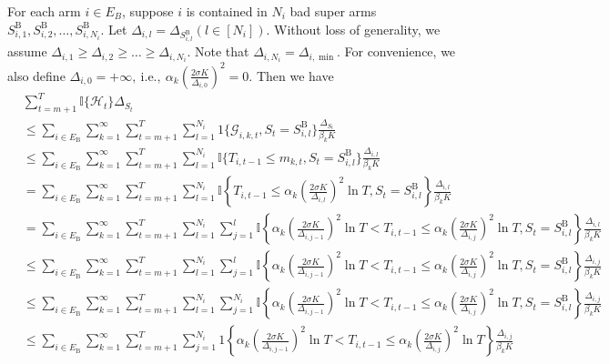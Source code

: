 \documentclass[opre,sglanonrev]{informs4}
\begin{document}
For each arm $i\in E_B$, suppose $i$ is contained in $N_i$ bad super arms $S_{i,1}^\mathrm{B},S_{i,2}^\mathrm{B},\ldots,S_{i,N_i}^\mathrm{B}$. Let $\Delta_{i,l} = \Delta_{S_{i,l}^\mathrm{B}}(l\in[N_i])$. Without loss of generality, we assume $\Delta_{i,1}\geq\Delta_{i,2}\geq\ldots\geq\Delta_{i,N_i}$. Note that $\Delta_{i,N_i}=\Delta_{i,\min}$. For convenience, we also define $\Delta_{i,0}=+\infty,\mathrm{~i.e.,~}\alpha_k\left(\frac{2\sigma K}{\Delta_{i,0}}\right)^2=0$. Then we have
$$\begin{aligned}
 & \sum_{t=m+1}^T\mathbb{I}\{\mathcal{H}_t\}\Delta_{S_t} \\
 & \leq\sum_{i\in E_\mathrm{B}}\sum_{k=1}^\infty\sum_{t=m+1}^T\sum_{l=1}^{N_i}1\{\mathcal{G}_{i,k,t},S_t=S_{i,l}^\mathrm{B}\}\frac{\Delta_{S_t}}{\beta_kK} \\
 & \leq\sum_{i\in E_\mathrm{B}}\sum_{k=1}^\infty\sum_{t=m+1}^T\sum_{l=1}^{N_i}\mathbb{I}\{T_{i,t-1}\leq m_{k,t},S_t=S_{i,l}^\mathrm{B}\}\frac{\Delta_{i,l}}{\beta_kK} \\
 & =\sum_{i\in E_\mathrm{B}}\sum_{k=1}^\infty\sum_{t=m+1}^T\sum_{l=1}^{N_i}\mathbb{I}\left\{T_{i,t-1}\leq\alpha_k\left(\frac{2\sigma K}{\Delta_{i,l}}\right)^2\ln T,S_t=S_{i,l}^\mathrm{B}\right\}\frac{\Delta_{i,l}}{\beta_kK} \\
 & =\sum_{i\in E_{\mathrm{B}}}\sum_{k=1}^{\infty}\sum_{t=m+1}^{T}\sum_{l=1}^{N_{i}}\sum_{j=1}^{l}\mathbb{I}\left\{\alpha_k\left(\frac{2\sigma K}{\Delta_{i,j-1}}\right)^{2}\ln T<T_{i,t-1}\leq\alpha_k\left(\frac{2\sigma K}{\Delta_{i,j}}\right)^{2}\ln T,S_{t}=S_{i,l}^{\mathrm{B}}\right\}\frac{\Delta_{i,l}}{\beta_{k}K} \\
 &\leq\sum_{i\in E_{\mathrm{B}}}\sum_{k=1}^{\infty}\sum_{t=m+1}^{T}\sum_{l=1}^{N_{i}}\sum_{j=1}^{l}\mathbb{I}\left\{\alpha_k\left(\frac{2\sigma K}{\Delta_{i,j-1}}\right)^{2}\ln T<T_{i,t-1}\leq\alpha_k\left(\frac{2\sigma K}{\Delta_{i,j}}\right)^{2}\ln T,S_{t}=S_{i,l}^{\mathrm{B}}\right\}\frac{\Delta_{i,j}}{\beta_{k}K}\\
 &\leq\sum_{i\in E_{\mathrm{B}}}\sum_{k=1}^{\infty}\sum_{t=m+1}^{T}\sum_{l=1}^{N_{i}}\sum_{j=1}^{N_{i}}\mathbb{I}\left\{\alpha_k\left(\frac{2\sigma K}{\Delta_{i,j-1}}\right)^{2}\ln T<T_{i,t-1}\leq\alpha_k\left(\frac{2\sigma K}{\Delta_{i,j}}\right)^{2}\ln T,S_{t}=S_{i,l}^{\mathrm{B}}\right\}\frac{\Delta_{i,j}}{\beta_{k}K}\\
 & \leq\sum_{i\in E_\mathrm{B}}\sum_{k=1}^\infty\sum_{t=m+1}^T\sum_{j=1}^{N_i}1\left\{\alpha_k\left(\frac{2\sigma K}{\Delta_{i,j-1}}\right)^2\ln T<T_{i,t-1}\leq\alpha_k\left(\frac{2\sigma K}{\Delta_{i,j}}\right)^2\ln T\right\}\frac{\Delta_{i,j}}{\beta_kK}\\
 \end{aligned}$$
\end{document}
